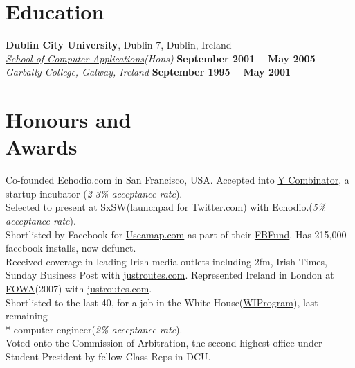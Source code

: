 \documentclass[margin,line]{resume}
\begin{document}
\begin{resume}
    \section{\mysidestyle Education}
    \textbf{Dublin City University}, Dublin 7, Dublin, Ireland \vspace{2mm}\\\vspace{1mm}%
    \textsl{\href{http://www.computing.dcu.ie}{School of Computer Applications}(Hons)} \hfill \textbf{ September 2001 -- May 2005}\\
    \textsl{Garbally College, Galway, Ireland} \hfill \textbf{September 1995 -- May 2001}\vspace{-3mm}\\\vspace{-1mm}%


    \section{\mysidestyle Honours and\\Awards} 

    Co-founded Echodio.com in San Francisco, USA. Accepted into \href{http://ycombinator.com/}{Y Combinator}, a startup incubator (\emph{2-3\% acceptance rate}).\vspace{1mm}\\%
    Selected to present at SxSW(launchpad for Twitter.com) with Echodio.(\emph{5\% acceptance rate}).\vspace{1mm}\\%
    Shortlisted by Facebook for \href{http://useamap.}{Useamap.com} as part of their \href{http://fbfund.com/about/}{FBFund}. Has 215,000 facebook installs, now defunct.\vspace{1mm}\\%
    Received coverage in leading Irish media outlets including 2fm, Irish Times, Sunday Business Post with \href{http://justroutes.com}{justroutes.com}. Represented Ireland in London at \href{http://futureofwebapps.com/}{FOWA}(2007) with \href{http://justroutes.com}{justroutes.com}.\vspace{1mm}\\%
    Shortlisted to the last 40, for a job in the White House(\href{http://wiprogram.org/WIP}{WIProgram}), last remaining \\* computer engineer(\emph{2\% acceptance rate}).\vspace{1mm}\\%
    Voted onto the Commission of Arbitration, the second highest office under Student President by fellow Class Reps in DCU.\vspace{1mm}\\%


\end{resume}
\end{document}
